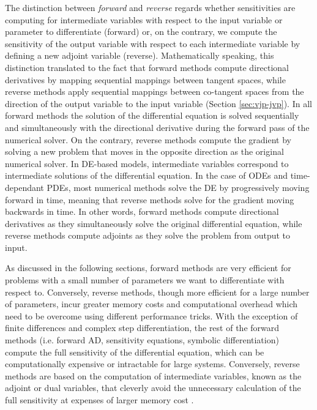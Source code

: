 The distinction between \textit{forward} and \textit{reverse} regards whether sensitivities are computing for intermediate variables with respect to the input variable or parameter to differentiate (forward) or, on the contrary, we compute the sensitivity of the output variable with respect to each intermediate variable by defining a new adjoint variable (reverse). 
Mathematically speaking, this distinction translated to the fact that forward methods compute directional derivatives by mapping sequential mappings between tangent spaces, while reverse methods apply sequential mappings between co-tangent spaces from the direction of the output variable to the input variable (Section \ref{sec:vjp-jvp}).   
In all forward methods the solution of the differential equation is solved sequentially and simultaneously with the directional derivative during the forward pass of the numerical solver. 
On the contrary, reverse methods compute the gradient by solving a new problem that moves in the opposite direction as the original numerical solver.
In DE-based models, intermediate variables correspond to intermediate solutions of the differential equation.
In the case of ODEs and time-dependant PDEs, most numerical methods solve the DE by progressively moving forward in time, meaning that reverse methods solve for the gradient moving backwards in time. 
In other words, forward methods compute directional derivatives as they simultaneously solve the original differential equation, while reverse methods compute adjoints as they solve the problem from output to input.

As discussed in the following sections, forward methods are very efficient for problems with a small number of parameters we want to differentiate with respect to. 
Conversely, reverse methods, though more efficient for a large number of parameters, incur greater memory costs and computational overhead which need to be overcome using different performance tricks. 
With the exception of finite differences and complex step differentiation, the rest of the forward methods (i.e. forward AD, sensitivity equations, symbolic differentiation) compute the full sensitivity of the differential equation, which can be computationally expensive or intractable for large systems. 
Conversely, reverse methods are based on the computation of intermediate variables, known as the adjoint or dual variables, that cleverly avoid the unnecessary calculation of the full sensitivity at expenses of larger memory cost \cite{Givoli_2021}. 

